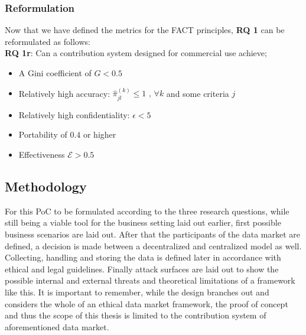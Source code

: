 \documentclass[english, 12pt, a4paper, sci, utf8, a-2b, online]{aaltothesis}
\theoremstyle{change}
\theoremstyle{theoremstyle}
\begin{document}
\subsubsection{Reformulation}
Now that we have defined the metrics for the FACT principles, \textbf{RQ 1} can be reformulated as follows:\\
\textbf{RQ 1r}\label{RQ1r}: Can a contribution system designed for commercial use achieve;
\begin{itemize}
    \item A Gini coefficient of $G < 0.5$
    \item Relatively high accuracy: $\hat{\pi}^{(k)}_{jl} \leq 1 \text{ , } \forall k$ and some criteria $j$
    \item Relatively high confidentiality: $\epsilon < 5$
    \item Portability of $0.4$ or higher
    \item Effectiveness $\mathcal{E} > 0.5$
\end{itemize}

\subsection{Methodology}
For this PoC to be formulated according to the three research questions, while still being a viable tool for the business setting laid out earlier, first possible business scenarios are laid out. After that the participants of the data market are defined, a decision is made between a decentralized and centralized model as well. Collecting, handling and storing the data is defined later in accordance with ethical and legal guidelines. Finally attack surfaces are laid out to show the possible internal and external threats and theoretical limitations of a framework like this. It is important to remember, while the design branches out and considers the whole of an ethical data market framework, the proof of concept and thus the scope of this thesis is limited to the contribution system of aforementioned data market.
\end{document}
